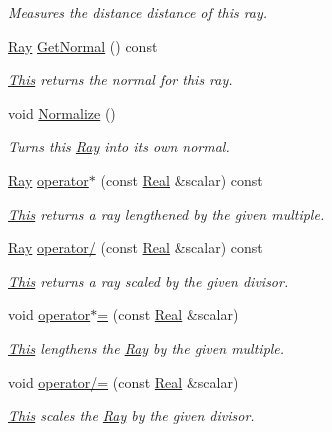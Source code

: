 \begin{DoxyCompactItemize}
\begin{DoxyCompactList}\small\item\em Measures the distance distance of this ray. \item\end{DoxyCompactList}\item 
\hyperlink{classphys_1_1Ray}{Ray} \hyperlink{classphys_1_1Ray_a7445c25acb6ce865ef85e7ada829ccba}{GetNormal} () const 
\begin{DoxyCompactList}\small\item\em \hyperlink{structThis}{This} returns the normal for this ray. \item\end{DoxyCompactList}\item 
void \hyperlink{classphys_1_1Ray_a2acbaef60718001a048db26ccaaef787}{Normalize} ()
\begin{DoxyCompactList}\small\item\em Turns this \hyperlink{classphys_1_1Ray}{Ray} into its own normal. \item\end{DoxyCompactList}\item 
\hyperlink{classphys_1_1Ray}{Ray} \hyperlink{classphys_1_1Ray_a6a47611776a9ab83d7ebc178a8d35b50}{operator$\ast$} (const \hyperlink{namespacephys_af7eb897198d265b8e868f45240230d5f}{Real} \&scalar) const 
\begin{DoxyCompactList}\small\item\em \hyperlink{structThis}{This} returns a ray lengthened by the given multiple. \item\end{DoxyCompactList}\item 
\hyperlink{classphys_1_1Ray}{Ray} \hyperlink{classphys_1_1Ray_a126f8e4db94cccb5c0040db29c771a47}{operator/} (const \hyperlink{namespacephys_af7eb897198d265b8e868f45240230d5f}{Real} \&scalar) const 
\begin{DoxyCompactList}\small\item\em \hyperlink{structThis}{This} returns a ray scaled by the given divisor. \item\end{DoxyCompactList}\item 
void \hyperlink{classphys_1_1Ray_acc1ac010f02f61b3d5234a5b619e926a}{operator$\ast$=} (const \hyperlink{namespacephys_af7eb897198d265b8e868f45240230d5f}{Real} \&scalar)
\begin{DoxyCompactList}\small\item\em \hyperlink{structThis}{This} lengthens the \hyperlink{classphys_1_1Ray}{Ray} by the given multiple. \item\end{DoxyCompactList}\item 
void \hyperlink{classphys_1_1Ray_a11f681152a5a39c36f2b398d44657ecd}{operator/=} (const \hyperlink{namespacephys_af7eb897198d265b8e868f45240230d5f}{Real} \&scalar)
\begin{DoxyCompactList}\small\item\em \hyperlink{structThis}{This} scales the \hyperlink{classphys_1_1Ray}{Ray} by the given divisor. \item\end{DoxyCompactList}\end{DoxyCompactItemize}
